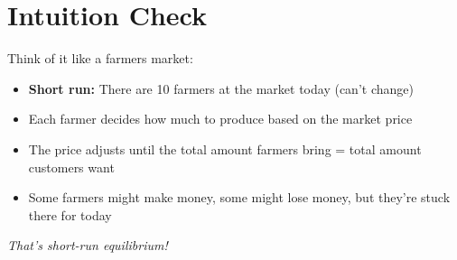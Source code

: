 \documentclass[11pt]{article}
\begin{document}
\section{Intuition Check}

Think of it like a farmers market:

\begin{itemize}[leftmargin=*]
    \item \textbf{Short run:} There are 10 farmers at the market today (can't change)
    \item Each farmer decides how much to produce based on the market price
    \item The price adjusts until the total amount farmers bring = total amount customers want
    \item Some farmers might make money, some might lose money, but they're stuck there for today
\end{itemize}

\vspace{0.5cm}

\textit{That's short-run equilibrium!}
\end{document}
